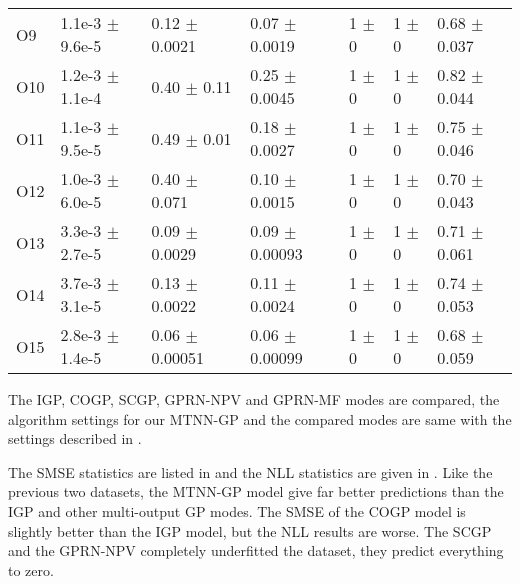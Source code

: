 \begin{table}[!htb]
\begin{tabular}{lllllll}
        O9     &  1.1e-3 $\pm$  9.6e-5 &  0.12 $\pm$  0.0021   &  0.07 $\pm$  0.0019   &  1  $\pm$  0  &  1  $\pm$  0 &  0.68 $\pm$  0.037 \\
        O10    &  1.2e-3 $\pm$  1.1e-4 &  0.40 $\pm$  0.11     &  0.25 $\pm$  0.0045   &  1  $\pm$  0  &  1  $\pm$  0 &  0.82 $\pm$  0.044 \\
        O11    &  1.1e-3 $\pm$  9.5e-5 &  0.49 $\pm$  0.01     &  0.18 $\pm$  0.0027   &  1  $\pm$  0  &  1  $\pm$  0 &  0.75 $\pm$  0.046 \\
        O12    &  1.0e-3 $\pm$  6.0e-5 &  0.40 $\pm$  0.071    &  0.10 $\pm$  0.0015   &  1  $\pm$  0  &  1  $\pm$  0 &  0.70 $\pm$  0.043 \\
        O13    &  3.3e-3 $\pm$  2.7e-5 &  0.09 $\pm$  0.0029   &  0.09 $\pm$  0.00093  &  1  $\pm$  0  &  1  $\pm$  0 &  0.71 $\pm$  0.061 \\
        O14    &  3.7e-3 $\pm$  3.1e-5 &  0.13 $\pm$  0.0022   &  0.11 $\pm$  0.0024   &  1  $\pm$  0  &  1  $\pm$  0 &  0.74 $\pm$  0.053 \\
        O15    &  2.8e-3 $\pm$  1.4e-5 &  0.06 $\pm$  0.00051  &  0.06 $\pm$  0.00099  &  1  $\pm$  0  &  1  $\pm$  0 &  0.68 $\pm$  0.059 \\
        \bottomrule
    \end{tabular}
\end{table}

The IGP, COGP, SCGP, GPRN-NPV and GPRN-MF modes are compared, the algorithm settings for our MTNN-GP and the compared modes are same with the settings described in . 

The SMSE statistics are listed in  and the NLL statistics are given in . Like the previous two datasets, the MTNN-GP model give far better predictions than the IGP and other multi-output GP modes. The SMSE of the COGP model is slightly better than the IGP model, but the NLL results are worse. The SCGP and the GPRN-NPV completely underfitted the dataset, they predict everything to zero.


